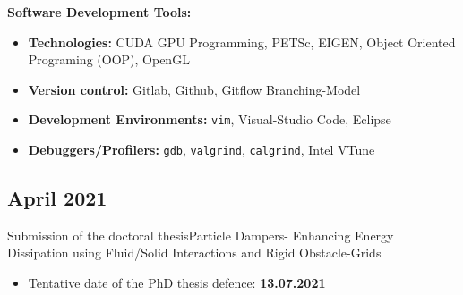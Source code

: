 \documentclass{mycv}
\begin{document}
\begin{paracol}{2}
	 {\bfseries Software Development Tools:}\par
	 \begin{itemize}
		 \item {\bfseries Technologies:} CUDA GPU Programming, PETSc, EIGEN,
			 Object Oriented Programing (OOP), OpenGL\par
		 \item {\bfseries Version control:} Gitlab, Github, Gitflow
			 Branching-Model\par
		 \item {\bfseries Development Environments:} \verb|vim|, Visual-Studio Code,
			 Eclipse \par
		 \item {\bfseries Debuggers/Profilers:} \verb|gdb|, \verb|valgrind|, \verb|calgrind|,
			 Intel VTune\\
	 \end{itemize}


		
\subsection{April 2021}{Submission of the doctoral thesis}{Particle Dampers-
Enhancing Energy Dissipation using Fluid/Solid Interactions and Rigid
Obstacle-Grids}
	  \begin{itemize}
			\item Tentative date of the PhD thesis defence:
				{\bfseries 13.07.2021}
		\end{itemize}
		\flushpage
\end{paracol}
\end{document}
